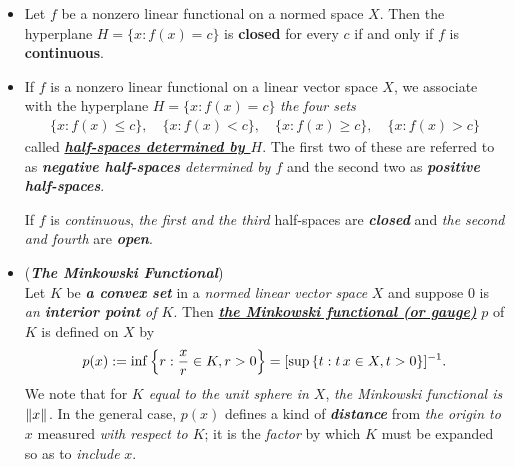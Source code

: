 \documentclass[11pt]{article}
\begin{document}
\begin{itemize}
\item \begin{proposition}
Let $f$ be a nonzero linear functional on a normed space $X$. Then the hyperplane $H =\{x: f(x) =c\}$ is \textbf{closed} for every $c$ if and only if
$f$ is \textbf{continuous}.
\end{proposition}

\item \begin{remark}
If $f$ is a nonzero linear functional on a linear vector space $X$, we associate with the hyperplane $H =\{x: f(x) =c\}$  \emph{the four sets}
\begin{align*}
\{x: f(x) \le c\}, \quad \{x: f(x) < c\}, \quad \{x: f(x) \ge c\}, \quad \{x: f(x) > c\}
\end{align*}
called \underline{\emph{\textbf{half-spaces determined by $H$}}}. The first two of these are referred to as \emph{\textbf{negative half-spaces} determined by $f$} and the second two as \emph{\textbf{positive half-spaces}}.

If $f$ is \emph{continuous},\emph{ the first and the third} half-spaces are \emph{\textbf{closed}} and \emph{the second and fourth} are \emph{\textbf{open}}.
\end{remark}

\item \begin{definition} (\emph{\textbf{The Minkowski Functional}}) \citep{luenberger1997optimization}\\
Let $K$ be \emph{\textbf{a convex set}} in a \emph{normed linear vector space} $X$ and suppose $0$ is \emph{an \textbf{interior point} of $K$}. Then \underline{\emph{\textbf{the Minkowski functional (or gauge)}}} $p$ of $K$ is defined on $X$ by
\begin{align*}
p(x) := \inf\left\{r: \frac{x}{r} \in K, r > 0\right\} = [\sup\left\{t: t\,x \in X, t > 0\right\}]^{-1}.
\end{align*}
We note that for \emph{$K$ equal to the unit sphere in $X$}, \emph{the Minkowski functional is $\left\|x\right\|_{}$}. In the general case, $p(x)$ defines a kind of \emph{\textbf{distance}} from \emph{the origin to $x$} measured \emph{with respect to $K$}; it is the \emph{factor} by which $K$ must be expanded so as to \emph{include} $x$.
\end{definition}


\end{itemize}
\end{document}
